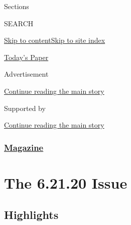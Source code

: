 Sections

SEARCH

\protect\hyperlink{site-content}{Skip to
content}\protect\hyperlink{site-index}{Skip to site index}

\href{https://myaccount.nytimes3xbfgragh.onion/auth/login?response_type=cookie\&client_id=vi}{}

\href{https://www.nytimes3xbfgragh.onion/section/todayspaper}{Today's
Paper}

Advertisement

\protect\hyperlink{after-top}{Continue reading the main story}

Supported by

\protect\hyperlink{after-sponsor}{Continue reading the main story}

\hypertarget{magazine}{%
\subsubsection{\texorpdfstring{\href{/section/magazine}{Magazine}}{Magazine}}\label{magazine}}

\hypertarget{the-62120-issue}{%
\section{The 6.21.20 Issue}\label{the-62120-issue}}

\hypertarget{highlights}{%
\subsection{Highlights}\label{highlights}}

